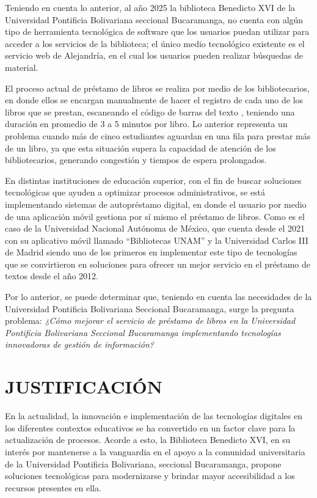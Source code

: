 \documentclass[spanish]{ieee_upb}
\begin{document}
Teniendo en cuenta lo anterior, al año 2025 la biblioteca Benedicto XVI de la Universidad Pontificia Bolivariana seccional Bucaramanga, no cuenta con algún tipo de herramienta tecnológica de software que los usuarios puedan utilizar para acceder a los servicios de la biblioteca; el único medio tecnológico existente es el servicio web de Alejandría, en el cual los usuarios pueden realizar búsquedas de material. 
\vspace{0.3 cm}
    
El  proceso actual de préstamo de libros se realiza por medio de los bibliotecarios, en donde ellos se encargan manualmente de hacer el registro de cada uno de los libros que se prestan, escaneando el código de barras del texto , teniendo una duración en promedio de 3 a 5 minutos por libro. Lo anterior representa un problema cuando más de cinco estudiantes aguardan en una fila para prestar más de un libro, ya que esta situación supera la capacidad de atención de los bibliotecarios, generando congestión y tiempos de espera prolongados.
\vspace{0.3 cm}

En distintas instituciones de educación superior, con el fin de buscar soluciones tecnológicas que ayuden a optimizar procesos administrativos, se está implementando sistemas de autopréstamo digital, en donde el usuario por medio de una aplicación móvil gestiona por sí mismo el préstamo de libros. Como es el caso de la Universidad Nacional Autónoma de México, que cuenta desde el 2021 con su aplicativo móvil llamado “Bibliotecas UNAM” y la Universidad Carlos III de Madrid siendo uno de los primeros en implementar este tipo de tecnologías que se convirtieron en soluciones para ofrecer un mejor servicio en el préstamo de textos desde el año 2012.
\vspace{0.3 cm}

Por lo anterior, se puede determinar que, teniendo en cuenta las necesidades de la Universidad Pontificia Bolivariana Seccional Bucaramanga, surge la pregunta problema: \textit{¿Cómo mejorar el servicio de préstamo de libros en la Universidad Pontificia Bolivariana Seccional Bucaramanga implementando tecnologías innovadoras de gestión de información?}


\newpage
\section{JUSTIFICACIÓN}

En la actualidad, la innovación e implementación de las tecnologías digitales en los diferentes contextos educativos se ha convertido en un factor clave para la actualización de procesos. Acorde a esto, la Biblioteca Benedicto XVI, en su interés por mantenerse a la vanguardia en el apoyo a la comunidad universitaria de la Universidad Pontificia Bolivariana, seccional Bucaramanga, propone soluciones tecnológicas para modernizarse y brindar mayor accesibilidad a los recursos presentes en ella.
\vspace{0.3 cm}
\end{document}
